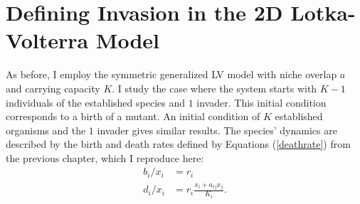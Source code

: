 \iffalse
Transient coexistence during the fixation/extinction process of immigrants/mutants has also been proposed as a mechanism for observed biodiversity in a number of contexts \cite{Kimura1964,Dias1996,Hubbell2001,Chesson2000,Leibold2006,Kessler2015,Vega2017}. 
The extent of this biodiversity is constrained by the interplay between the residence times of these invaders and the rate at which they appear in a settled population. 
In the previous sections we calculated the fixation times in the two species system starting from the deterministically stable fixed point. 
In this section we investigate the complementary problem of robustness of a stable population of one species with respect to an invasion of another species, arising either through mutation or immigration, and investigate the effect of niche overlap and system size on the probability and mean times of successful and failed invasions. 
\fi


\section{Defining Invasion in the 2D Lotka-Volterra Model}

As before, I employ the symmetric generalized LV model with niche overlap $a$ and carrying capacity $K$. 
I study the case where the system starts with $K-1$ individuals of the established species and $1$ invader. 
This initial condition corresponds to a birth of a mutant. 
An initial condition of $K$ established organisms and the $1$ invader gives similar results. 
The species' dynamics are described by the birth and death rates defined by Equations (\ref{deathrate}) from the previous chapter, which I reproduce here:
\begin{align*}
	b_i/x_i &= r_i \\
	d_i/x_i &= r_i\frac{x_i+a_{ij}x_j}{K_i}. 
\end{align*}

